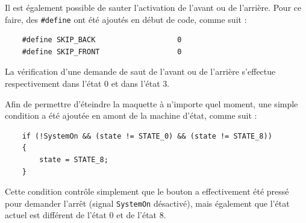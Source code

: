 Il est également possible de sauter l'activation de l'avant ou de l'arrière. Pour ce faire, des \texttt{\#define} ont été ajoutés en début de code, comme suit :

\begin{verbatim}
    #define SKIP_BACK                   0
    #define SKIP_FRONT                  0
\end{verbatim}

La vérification d'une demande de saut de l'avant ou de l'arrière s'effectue respectivement dans l'état 0 et dans l'état 3.

Afin de permettre d'éteindre la maquette à n'importe quel moment, une simple condition a été ajoutée en amont de la machine d'état, comme suit :

\begin{verbatim}
    if (!SystemOn && (state != STATE_0) && (state != STATE_8))
    {
        state = STATE_8;
    }
\end{verbatim}

Cette condition contrôle simplement que le bouton a effectivement été pressé pour demander l'arrêt (signal \texttt{SystemOn} désactivé), mais également que l'état actuel est différent de l'état 0 et de l'état 8.

\clearpage